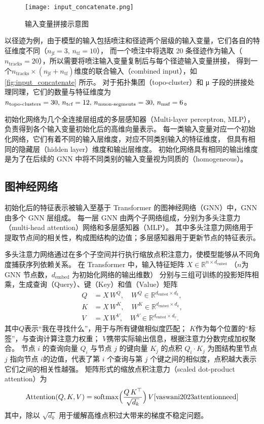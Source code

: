 \begin{figure}[ht]
    \centering
    \texttt{[image: input\_concatenate.png]}
    \caption{输入变量拼接示意图}
    \label{fig:input_concatenate}
\end{figure}

以径迹为例，由于模型的输入包括喷注和径迹两个层级的输入变量，它们各自的特征维度不同（$n_\text{jf}=3, \, n_\text{tf}=10$），
而一个喷注中将选取 20 条径迹作为输入（$n_\text{tracks}=20$），所以需要将喷注输入变量复制后与每个径迹输入变量拼接，
得到一个$n_\text{tracks} \times (n_\text{jf} + n_\text{tf})$维度的联合输入（combined input），如\autoref{fig:input_concatenate} 所示。
对于拓扑集团（topo-cluster）和 μ 子段的拼接处理同理，它们的数量与特征维度为
$n_\text{topo-clusters} = 30, \, n_\text{tcf}=12, \, n_\text{muon-segments}=30, \, n_\text{msf}=6$。

初始化网络为几个全连接层组成的多层感知器（Multi-layer perceptron, MLP），负责得到各个输入变量初始化后的高维向量表示。
每一类输入变量对应一个初始化网络，它们有着不同的输入层维度，对应不同类别输入的特征维度，
但具有相同的隐藏层（hidden layer）维度和输出层维度。
初始化网络具有相同的输出维度是为了在后续的 GNN 中将不同类别的输入变量视为同质的（homogeneous）。


\subsection{图神经网络}
初始化后的特征表示被输入至基于 Transformer 的图神经网络（GNN）中，GNN 由多个 GNN 层组成。
每一层 GNN 由两个子网络组成，分别为多头注意力（multi-head attention）网络和多层感知器（MLP）。
其中多头注意力网络用于提取节点间的相关性，构成图结构的边值；多层感知器用于更新节点的特征表示。

多头注意力网络通过在多个子空间并行执行缩放点积注意力，使模型能够从不同角度捕获序列依赖关系。
在 Transformer 中，输入特征矩阵 ${X}\in\mathbb{R}^{n\times d_{\mathrm{embed}}}$
（$n$为 GNN 节点数，$d_{\mathrm{embed}}$ 为初始化网络的输出维数）
分别与三组可训练的投影矩阵相乘，生成查询（Query）、键（Key）和值（Value）矩阵
\begin{align}
    {Q} & = {X}\,W^Q, \quad W^Q \in\mathbb{R}^{d_{\mathrm{embed}}\times d_k}, \\
    {K} & = {X}\,W^K, \quad W^K \in\mathbb{R}^{d_{\mathrm{embed}}\times d_k}, \\
    {V} & = {X}\,W^V, \quad W^V \in\mathbb{R}^{d_{\mathrm{embed}}\times d_v}.
\end{align}
其中${Q}$表示“我在寻找什么”，用于与所有键做相似度匹配；
${K}$作为每个位置的“标签”，与查询计算注意力权重；
${V}$携带实际输出信息，根据注意力分数完成加权聚合。
节点 $i$ 的查询向量 ${Q}_i$ 与节点 $j$ 的键向量 ${K}_j$ 的点积 ${Q}_i \cdot {K}_j$
为图结构里节点 $j$ 指向节点 $i$的边值，代表了第 $i$ 个查询与第 $j$ 个键之间的相似度，点积越大表示它们之间的相关性越强。
矩阵形式的缩放点积注意力（scaled dot-product attention）为
\begin{align}
    \mathrm{Attention}({Q},{K},{V})
    = \mathrm{softmax} \Bigl(\frac{{Q}\,{K}^\top}{\sqrt{d_k}}\Bigr)\,{V}
    \cite{vaswani2023attentionneed}
\end{align}
其中，除以 $\sqrt{d_k}$ 用于缓解高维点积过大带来的梯度不稳定问题。

